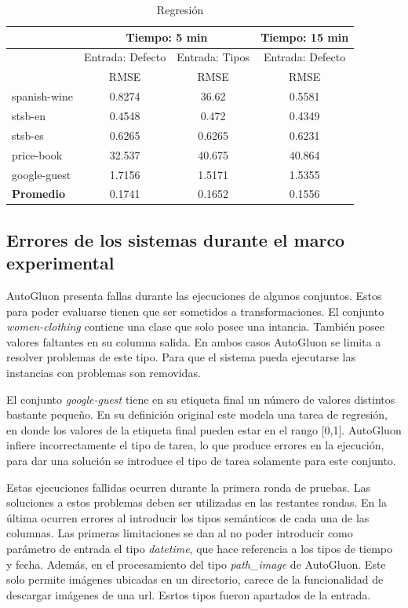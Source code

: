 \begin{table}
  \centering
  \resizebox{15cm}{!} {
  \begin{tabular}{|l|ccc|}
  \hline
  & \multicolumn{2}{p{8cm}|}{Tiempo: 5 min}  & \multicolumn{1}{p{4cm}|}{Tiempo: 15 min}\\  \hline
  & \multicolumn{1}{p{4cm}|}{Entrada: Defecto} & \multicolumn{1}{p{4cm}|}{Entrada: Tipos} & \multicolumn{1}{p{4cm}|}{Entrada: Defecto}\\ \hline
               & RMSE  & RMSE  & RMSE  \\ \hline
  spanish-wine & 0.8274  & 36.62  & 0.5581 \\
  stsb-en      & 0.4548  & 0.472  & 0.4349 \\
  stsb-es      & 0.6265  & 0.6265 & 0.6231   \\ 
  price-book   & 32.537  & 40.675 & 40.864  \\
  google-guest & 1.7156  & 1.5171 & 1.5355  \\ \hline
  \textbf{Promedio} & 0.1741 & 0.1652 & 0.1556 \\ \hline

\end{tabular}
  \caption{Regresión}
  \label{fig:regression}
  }
\end{table}


\subsection{Errores de los sistemas durante el marco experimental}\label{subsection:errors}
AutoGluon presenta fallas durante las ejecuciones de algunos conjuntos. Estos para poder evaluarse tienen que ser sometidos a transformaciones.
El conjunto \textit{women-clothing} contiene una clase que solo posee una intancia. También posee valores faltantes en su columna salida. En ambos casos AutoGluon se 
limita a resolver problemas de este tipo. Para que el sistema pueda ejecutarse las instancias con problemas son removidas.

El conjunto \textit{google-guest} tiene en su etiqueta final un número de valores distintos bastante pequeño. En su definición original este modela una tarea de regresión, en 
donde los valores de la etiqueta final pueden estar en el rango [0,1]. AutoGluon infiere incorrectamente el tipo de tarea, lo que produce errores en la ejecución, para 
dar una solución se introduce el tipo de tarea solamente para este conjunto.

Estas ejecuciones fallidas ocurren durante la primera ronda de pruebas. Las soluciones a estos problemas deben ser utilizadas en las restantes rondas. 
En la última ocurren errores al introducir los tipos semánticos de cada una de las columnas. Las primeras limitaciones se dan al no poder introducir como 
parámetro de entrada el tipo \textit{datetime}, que hace referencia a los tipos de tiempo y fecha. Además, en el procesamiento del tipo \textit{path\_image} de AutoGluon. 
Este solo permite imágenes ubicadas en un directorio, carece de la funcionalidad de descargar imágenes de una url.  Esrtos tipos fueron apartados de la entrada.


